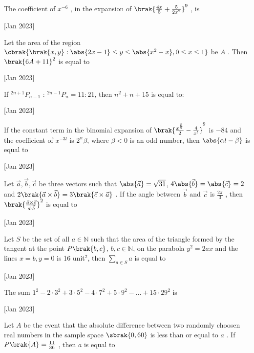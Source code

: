 \iffalse
  \title{2023}
  \author{EE24BTECH11010}
  \section{integer}
\fi
\item The coefficient of $x^{-6}$
, in the expansion of $\brak{\frac{4x}{5} + \frac{5}{2x^2}}^9$
, is

\hfill[Jan 2023]

\item Let the area of the region $\cbrak{\brak{x,y} : \abs{2x-1} \leq y \leq \abs{x^2 - x}, 0 \leq x \leq 1}$
 be $A$ . Then $\brak{6A + 11}^2$  
 is equal to 

 \hfill[Jan 2023]

 \item If $^{2n+1}P_{n-1} \text{ : } ^{2n-1}P_n = 11:21$, then $n^2 + n +15$ is equal to:

\hfill [Jan 2023]

\item If the constant term in the binomial expansion of 
$\brak{\frac{x^{\frac{5}{2}}}{2} - \frac{4}{x^l}}^9$ is $-84$ and the coefficient of $x^{-3l}$ 
 is $2^{\alpha}\beta$, where $\beta < 0$
 is an odd number, then $\abs{\alpha l - \beta}$
 is equal to

 \hfill[Jan 2023]

 \item Let $\vec{a}, \vec{b}, \vec{c}$
 be three vectors such that
$\abs{\vec{a}} = \sqrt{31}$, $4\abs{\vec{b}} = \abs{\vec{c}} = 2$
 and $2\brak{\vec{a} \times \vec{b}} = 3 \brak{\vec{c} \times \vec{a}}$
. If the angle between $\vec{b}$
 and $\vec{c}$
 is $\frac{2\pi}{3}$
, then $\brak{\frac{\vec{a} \times \vec{c}}{\vec{a}\cdot \vec{b}}}^2$ is equal to

\hfill [Jan 2023]

\item Let $S$ be the set of all $a \in \mathbb{N}$ such that the area of the triangle formed by the tangent at the point $P\brak{b,c}$, $b,c \in \mathbb{N}$, on the parabola $y^2 = 2ax $ and the lines $x = b, y = 0 $ is 16 unit$^2$, then $\sum_{a \in S} a $ is equal to 

\hfill [Jan 2023]

\item The sum $1^2 - 2\cdot3^2 + 3\cdot5^2 - 4\cdot7^2 + 5\cdot9^2 - \ldots + 15\cdot29^2$ is 

\hfill[Jan 2023]

\item Let $A$ be the event that the absolute difference between two randomly choosen real numbers in the sample space $\sbrak{0,60}$
 is less than or equal to $a$ . If $P\brak{A} = \frac{11}{36}$ , then $a$ 
 is equal to 

